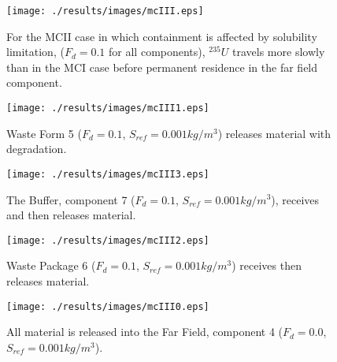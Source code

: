 
\begin{figure}[ht]
\centering
\texttt{[image: ./results/images/mcIII.eps]}
\caption[$^{235}U$ residence. Mixed Cell Coupled Sorption and Solubility Limitation.]{
For the MCII case in which containment is affected by solubility limitation,
($F_{d}=0.1$ for all components), $^{235}U$ travels more slowly than in the MCI case
before permanent residence in the far field component.
}
\label{fig:mcIIIall}
\begin{minipage}[b]{0.45\linewidth}

  \texttt{[image: ./results/images/mcIII1.eps]}
  \caption[Case MCII Waste Form Contaminants.]{
    Waste Form 5 ($F_d = 0.1$, $S_{ref} = 0.001kg/m^3$) releases material with degradation.
    }
  \label{fig:mcIIIwf5}

  \texttt{[image: ./results/images/mcIII3.eps]}
  \caption[Case MCII Buffer Contaminants]{
    The Buffer, component 7 ($F_d=0.1$, $S_{ref}=0.001kg/m^3$), receives and then releases material.
    }
  \label{fig:mcIIIbuff}

\end{minipage}
\hspace{0.05\linewidth}
\begin{minipage}[b]{0.45\linewidth}
  \texttt{[image: ./results/images/mcIII2.eps]}
  \caption[Case MCII Waste Package Contaminants.]{
    Waste Package 6 ($F_d = 0.1$, $S_{ref}=0.001kg/m^3$) receives then releases material.
    }
  \label{fig:mcIIIwp6}

  \texttt{[image: ./results/images/mcIII0.eps]}
  \caption[Case MCII Waste Package Contaminants.]{All material is released into
    the Far Field, component 4 ($F_d=0.0$, $S_{ref} = 0.001kg/m^3$).}
  \label{fig:mcII}


  \end{minipage}
\end{figure}

